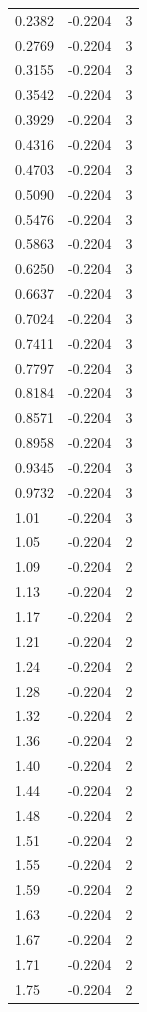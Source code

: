 \begin{longtable}{lrr}
  0.2382 & -0.2204 & 3 \\
  0.2769 & -0.2204 & 3 \\
  0.3155 & -0.2204 & 3 \\
  0.3542 & -0.2204 & 3 \\
  0.3929 & -0.2204 & 3 \\
  0.4316 & -0.2204 & 3 \\
  0.4703 & -0.2204 & 3 \\
  0.5090 & -0.2204 & 3 \\
  0.5476 & -0.2204 & 3 \\
  0.5863 & -0.2204 & 3 \\
  0.6250 & -0.2204 & 3 \\
  0.6637 & -0.2204 & 3 \\
  0.7024 & -0.2204 & 3 \\
  0.7411 & -0.2204 & 3 \\
  0.7797 & -0.2204 & 3 \\
  0.8184 & -0.2204 & 3 \\
  0.8571 & -0.2204 & 3 \\
  0.8958 & -0.2204 & 3 \\
  0.9345 & -0.2204 & 3 \\
  0.9732 & -0.2204 & 3 \\
  1.01 & -0.2204 & 3 \\
  1.05 & -0.2204 & 2 \\
  1.09 & -0.2204 & 2 \\
  1.13 & -0.2204 & 2 \\
  1.17 & -0.2204 & 2 \\
  1.21 & -0.2204 & 2 \\
  1.24 & -0.2204 & 2 \\
  1.28 & -0.2204 & 2 \\
  1.32 & -0.2204 & 2 \\
  1.36 & -0.2204 & 2 \\
  1.40 & -0.2204 & 2 \\
  1.44 & -0.2204 & 2 \\
  1.48 & -0.2204 & 2 \\
  1.51 & -0.2204 & 2 \\
  1.55 & -0.2204 & 2 \\
  1.59 & -0.2204 & 2 \\
  1.63 & -0.2204 & 2 \\
  1.67 & -0.2204 & 2 \\
  1.71 & -0.2204 & 2 \\
  1.75 & -0.2204 & 2 \\

\end{longtable}
